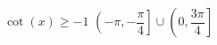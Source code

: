 { $\cot \left( x \right) \geq -1$ }
{ $\left( -\pi, -\dfrac{\pi}{4} \right] \cup \left( 0, \dfrac{3\pi}{4} \right]$}
